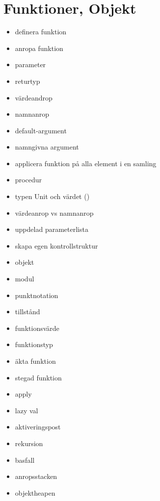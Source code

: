 \chapter{Funktioner, Objekt}\label{chapter:W03}
\begin{multicols}{2}\begin{itemize}[nosep,label={$\square$}]
\item definera funktion
\item anropa funktion
\item parameter
\item returtyp
\item värdeandrop
\item namnanrop
\item default-argument
\item namngivna argument
\item applicera funktion på alla element i en samling
\item procedur
\item typen Unit och värdet ()
\item värdeanrop vs namnanrop
\item uppdelad parameterlista
\item skapa egen kontrollstruktur
\item objekt
\item modul
\item punktnotation
\item tillstånd
\item funktionsvärde
\item funktionstyp
\item äkta funktion
\item stegad funktion
\item apply
\item lazy val
\item aktiveringspost
\item rekursion
\item basfall
\item anropsstacken
\item objektheapen\end{itemize}\end{multicols}
